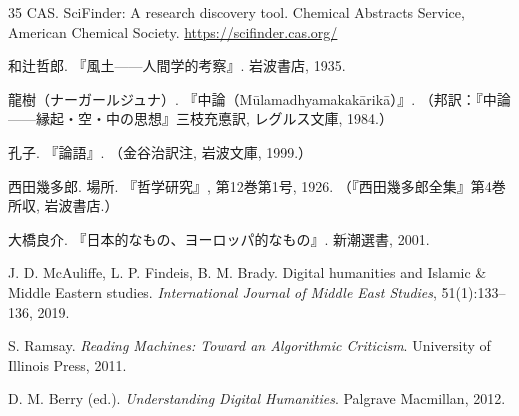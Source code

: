 \documentclass[a4paper,11pt]{ltjsarticle}
\begin{document}
\begin{thebibliography}{35}
 CAS. SciFinder: A research discovery tool. Chemical Abstracts Service, American Chemical Society. \url{https://scifinder.cas.org/}

 和辻哲郎. 『風土——人間学的考察』. 岩波書店, 1935.

 龍樹（ナーガールジュナ）. 『中論（Mūlamadhyamakakārikā）』. （邦訳：『中論——縁起・空・中の思想』三枝充悳訳, レグルス文庫, 1984.）

 孔子. 『論語』. （金谷治訳注, 岩波文庫, 1999.）

 西田幾多郎. 場所. 『哲学研究』, 第12巻第1号, 1926. （『西田幾多郎全集』第4巻所収, 岩波書店.）

 大橋良介. 『日本的なもの、ヨーロッパ的なもの』. 新潮選書, 2001.

 J. D. McAuliffe, L. P. Findeis, B. M. Brady. Digital humanities and Islamic \& Middle Eastern studies. \textit{International Journal of Middle East Studies}, 51(1):133--136, 2019.

 S. Ramsay. \textit{Reading Machines: Toward an Algorithmic Criticism}. University of Illinois Press, 2011.

 D. M. Berry (ed.). \textit{Understanding Digital Humanities}. Palgrave Macmillan, 2012.

\end{thebibliography}
\end{document}
